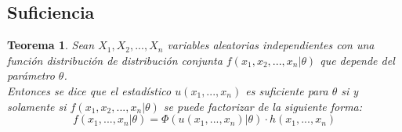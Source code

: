 \documentclass[a4paper, 10pt]{article} %
\newtheorem{theorem}{Teorema}[section]
\begin{document}

\subsection{Suficiencia}

\begin{theorem}
Sean $X_1, X_2, ..., X_n$ variables aleatorias independientes con una función distribución de distribución conjunta $f(x_1, x_2, ..., x_n | \theta)$ que depende del parámetro $\theta$. \\
Entonces se dice que el estadístico $u(x_1, ..., x_n)$ es suficiente para $\theta$ si y solamente si $f(x_1, x_2, ..., x_n | \theta)$ se puede factorizar de la siguiente forma: \\
$$ f(x_1,...,x_n| \theta) = \Phi(u(x_1, ..., x_n) | \theta)\cdot h(x_1, ..., x_n) $$
\end{theorem}

%
\end{document}
